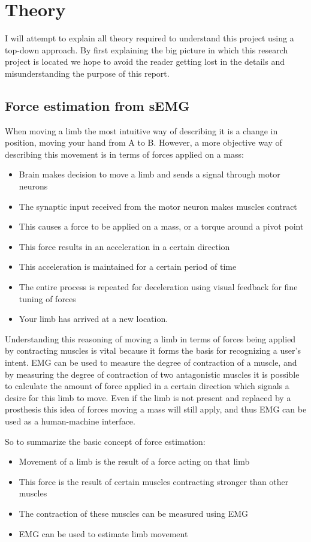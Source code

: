 \chapter{Theory}
I will attempt to explain all theory required to understand this project using a top-down approach. By first explaining the big picture in which this research project is located we hope to avoid the reader getting lost in the details and misunderstanding the purpose of this report. 

\section{Force estimation from sEMG}
When moving a limb the most intuitive way of describing it is a change in position, moving your hand from A to B. However, a more objective way of describing this movement is in terms of forces applied on a mass:
\begin{itemize}
    \item Brain makes decision to move a limb and sends a signal through motor neurons
    \item The synaptic input received from the motor neuron makes muscles contract
    \item This causes a force to be applied on a mass, or a torque around a pivot point
    \item This force results in an acceleration in a certain direction
    \item This acceleration is maintained for a certain period of time
    \item The entire process is repeated for deceleration using visual feedback for fine tuning of forces
    \item Your limb has arrived at a new location.
\end{itemize}

Understanding this reasoning of moving a limb in terms of forces being applied by contracting muscles is vital because it forms the basis for recognizing a user's intent. EMG can be used to measure the degree of contraction of a muscle, and by measuring the degree of contraction of two antagonistic muscles it is possible to calculate the amount of force applied in a certain direction which signals a desire for this limb to move. Even if the limb is not present and replaced by a prosthesis this idea of forces moving a mass will still apply, and thus EMG can be used as a human-machine interface.

So to summarize the basic concept of force estimation:
\begin{itemize}
    \item Movement of a limb is the result of a force acting on that limb
    \item This force is the result of certain muscles contracting stronger than other muscles
    \item The contraction of these muscles can be measured using EMG
    \item EMG can be used to estimate limb movement
\end{itemize}

